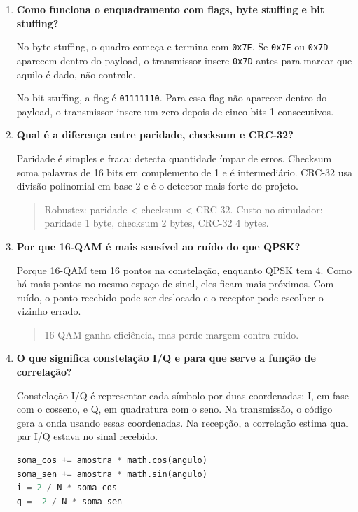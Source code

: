 \documentclass[11pt,a4paper]{article}
\newcommand{\rank}[1]{\textcolor{rankblue}{\textbf{Rank #1}}}
\begin{document}
\begin{enumerate}[leftmargin=1.2cm, itemsep=8pt]
  \item[\rank{11}.] \textbf{Como funciona o enquadramento com flags, byte stuffing e bit stuffing?}

  No byte stuffing, o quadro começa e termina com \texttt{0x7E}. Se \texttt{0x7E} ou \texttt{0x7D} aparecem dentro do payload, o transmissor insere \texttt{0x7D} antes para marcar que aquilo é dado, não controle.

  No bit stuffing, a flag é \texttt{01111110}. Para essa flag não aparecer dentro do payload, o transmissor insere um zero depois de cinco bits 1 consecutivos.

  \item[\rank{12}.] \textbf{Qual é a diferença entre paridade, checksum e CRC-32?}

  Paridade é simples e fraca: detecta quantidade ímpar de erros. Checksum soma palavras de 16 bits em complemento de 1 e é intermediário. CRC-32 usa divisão polinomial em base 2 e é o detector mais forte do projeto.

  \begin{quote}
  Robustez: paridade < checksum < CRC-32. Custo no simulador: paridade 1 byte, checksum 2 bytes, CRC-32 4 bytes.
  \end{quote}

  \item[\rank{13}.] \textbf{Por que 16-QAM é mais sensível ao ruído do que QPSK?}

  Porque 16-QAM tem 16 pontos na constelação, enquanto QPSK tem 4. Como há mais pontos no mesmo espaço de sinal, eles ficam mais próximos. Com ruído, o ponto recebido pode ser deslocado e o receptor pode escolher o vizinho errado.

  \begin{quote}
  16-QAM ganha eficiência, mas perde margem contra ruído.
  \end{quote}

  \item[\rank{14}.] \textbf{O que significa constelação I/Q e para que serve a função de correlação?}

  Constelação I/Q é representar cada símbolo por duas coordenadas: I, em fase com o cosseno, e Q, em quadratura com o seno. Na transmissão, o código gera a onda usando essas coordenadas. Na recepção, a correlação estima qual par I/Q estava no sinal recebido.

  \begin{lstlisting}[language=Python]
soma_cos += amostra * math.cos(angulo)
soma_sen += amostra * math.sin(angulo)
i = 2 / N * soma_cos
q = -2 / N * soma_sen
  \end{lstlisting}


\end{enumerate}
\end{document}
